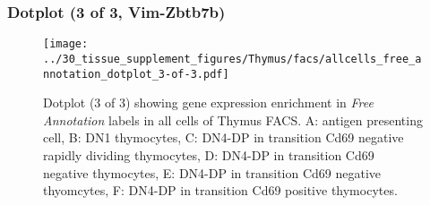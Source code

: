 \clearpage

\subsubsection{Dotplot (3 of 3, Vim-Zbtb7b)}
\begin{figure}[h]
\centering
\texttt{[image: ../30\_tissue\_supplement\_figures/Thymus/facs/allcells\_free\_annotation\_dotplot\_3-of-3.pdf]}

\caption{ Dotplot (3 of 3)  showing gene expression enrichment in \emph{Free Annotation} labels in all cells of Thymus FACS. A: antigen presenting cell, B: DN1 thymocytes, C: DN4-DP in transition Cd69 negative rapidly dividing thymocytes, D: DN4-DP in transition Cd69 negative thymocytes, E: DN4-DP in transition Cd69 negative thyomcytes, F: DN4-DP in transition Cd69 positive thymocytes.}
\end{figure}

